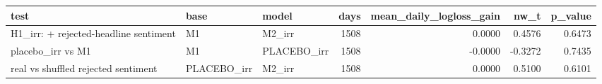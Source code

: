 \begin{tabular}{lllrrrr}
\toprule
test & base & model & days & mean\_daily\_logloss\_gain & nw\_t & p\_value \\
\midrule
H1\_irr: + rejected-headline sentiment & M1 & M2\_irr & 1508 & 0.0000 & 0.4576 & 0.6473 \\
placebo\_irr vs M1 & M1 & PLACEBO\_irr & 1508 & -0.0000 & -0.3272 & 0.7435 \\
real vs shuffled rejected sentiment & PLACEBO\_irr & M2\_irr & 1508 & 0.0000 & 0.5100 & 0.6101 \\
\bottomrule
\end{tabular}
